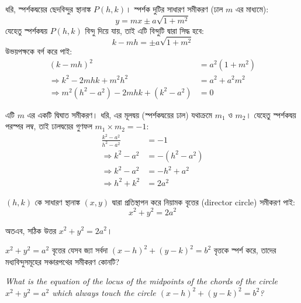 \documentclass[12pt, a4paper]{article}
\begin{document}
\begin{tcolorbox}[solutionbox={সমাধান (Solution)}]
    \noindent
    ধরি, স্পর্শকদ্বয়ের ছেদবিন্দুর স্থানাঙ্ক $P(h, k)$। স্পর্শক দুটির সাধারণ সমীকরণ (ঢাল $m$ এর মাধ্যমে):
    \[ y = mx \pm a\sqrt{1 + m^2} \]
    যেহেতু স্পর্শকদ্বয় $P(h, k)$ বিন্দু দিয়ে যায়, তাই এটি বিন্দুটি দ্বারা সিদ্ধ হবে:
    \[ k - mh = \pm a\sqrt{1 + m^2} \]
    উভয়পক্ষকে বর্গ করে পাই:
    \begin{align*}
        (k - mh)^2 &= a^2(1 + m^2) \\
        \Rightarrow k^2 - 2mhk + m^2h^2 &= a^2 + a^2m^2 \\
        \Rightarrow m^2(h^2 - a^2) - 2mhk + (k^2 - a^2) &= 0
    \end{align*}
    
    \vspace{0.5em}
    এটি $m$ এর একটি দ্বিঘাত সমীকরণ। ধরি, এর মূলদ্বয় (স্পর্শকদ্বয়ের ঢাল) যথাক্রমে $m_1$ ও $m_2$। যেহেতু স্পর্শকদ্বয় পরস্পর লম্ব, তাই ঢালদ্বয়ের গুণফল $m_1 \times m_2 = -1$:
    \begin{align*}
        \frac{k^2 - a^2}{h^2 - a^2} &= -1 \\
        \Rightarrow k^2 - a^2 &= -(h^2 - a^2) \\
        \Rightarrow k^2 - a^2 &= -h^2 + a^2 \\
        \Rightarrow h^2 + k^2 &= 2a^2
    \end{align*}
    
    \vspace{0.5em}
    $(h, k)$ কে সাধারণ স্থানাঙ্ক $(x, y)$ দ্বারা প্রতিস্থাপন করে নিয়ামক বৃত্তের (director circle) সমীকরণ পাই:
    \[ x^2 + y^2 = 2a^2 \]
    
    \vspace{0.5em}
    অতএব, সঠিক উত্তর $x^2 + y^2 = 2a^2$।
\end{tcolorbox}

\vspace{2em}

\begin{tcolorbox}[questionbox={প্রশ্ন (Question) 38}]
    \noindent
    $x^2 + y^2 = a^2$ বৃত্তের যেসব জ্যা সর্বদা $(x - h)^2 + (y - k)^2 = b^2$ বৃত্তকে স্পর্শ করে, তাদের মধ্যবিন্দুসমূহের সঞ্চারপথের সমীকরণ কোনটি?
    
    \vspace{0.8em}
    \begin{english}
    \noindent\textit{\color{darkgray}
    What is the equation of the locus of the midpoints of the chords of the circle $x^2 + y^2 = a^2$ which always touch the circle $(x - h)^2 + (y - k)^2 = b^2$?
    }
    \end{english}
\end{tcolorbox}
\end{document}
